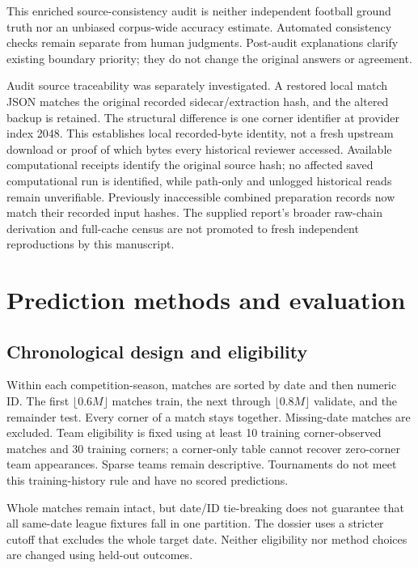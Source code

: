 \documentclass[sigconf,nonacm]{acmart}
\begin{document}
This enriched source-consistency audit is neither independent football ground
truth nor an unbiased corpus-wide accuracy estimate. Automated consistency checks
remain separate from human judgments. Post-audit explanations clarify existing
boundary priority; they do not change the original answers or agreement.

Audit source traceability was separately investigated. A restored local match
JSON matches the original recorded sidecar/extraction hash, and the altered backup
is retained. The structural difference is one corner identifier at provider index
2048. This establishes local recorded-byte identity, not a fresh upstream download
or proof of which bytes every historical reviewer accessed. Available computational
receipts identify the original source hash; no affected saved computational run is
identified, while path-only and unlogged historical reads remain unverifiable.
Previously inaccessible combined preparation records now match their recorded
input hashes. The supplied report's broader raw-chain derivation and full-cache
census are not promoted to fresh independent reproductions by this manuscript.

\section{Prediction methods and evaluation}
\subsection{Chronological design and eligibility}
Within each competition-season, matches are sorted by date and then numeric ID.
The first $\lfloor0.6M\rfloor$ matches train, the next through
$\lfloor0.8M\rfloor$ validate, and the remainder test. Every corner of a match
stays together. Missing-date matches are excluded. Team eligibility is fixed using
at least 10 training corner-observed matches and 30 training corners; a corner-only
table cannot recover zero-corner team appearances. Sparse teams remain descriptive.
Tournaments do not meet this training-history rule and have no scored predictions.

Whole matches remain intact, but date/ID tie-breaking does not guarantee that all
same-date league fixtures fall in one partition. The dossier uses a stricter cutoff that excludes the whole target date. Neither eligibility nor
method choices are changed using held-out outcomes.
\end{document}
